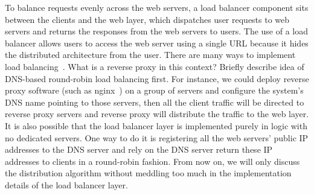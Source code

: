 To balance requests evenly across the web servers, a load balancer
component sits between the clients and the web layer,
which dispatches user requests to web servers
and returns the responses from the web servers to users.
The use of a load balancer allows users to access the web server
using a single URL because it hides the distributed architecture from the user.
There are many ways to implement load balancing~\cite{cardellini2002state}.
%
%
%
%
What is a reverse proxy in this context?
%
Briefly describe idea of DNS-based round-robin load balancing first.
% 
For instance, we could deploy reverse proxy software (such as nginx~\cite{nginx})
on a group of servers and configure the system's DNS name pointing to those servers,
then all the client traffic will be directed to reverse proxy servers
and reverse proxy will distribute the traffic to the web layer.
%
It is also possible that the load balancer layer is implemented purely in logic 
with no dedicated servers.
One way to do it is
 registering all the web servers' public IP addresses to the DNS server
and rely on the DNS server return these IP addresses to clients in a round-robin
fashion.
From now on, we will only discuss the distribution algorithm without meddling too much
in the implementation details of the load balancer layer.
%
%






